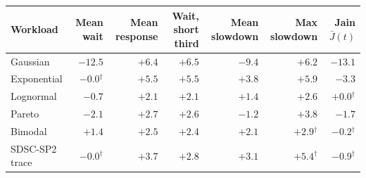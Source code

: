 \begin{tabular}{lrrrrrr}
\toprule
Workload & Mean wait & Mean response & Wait, short third & Mean slowdown & Max slowdown & Jain $\bar J(t)$ \\
\midrule
Gaussian & $-12.5$ & $+6.4$ & $+6.5$ & $-9.4$ & $+6.2$ & $-13.1$ \\
Exponential & $-0.0$$^{\dagger}$ & $+5.5$ & $+5.5$ & $+3.8$ & $+5.9$ & $-3.3$ \\
Lognormal & $-0.7$ & $+2.1$ & $+2.1$ & $+1.4$ & $+2.6$ & $+0.0$$^{\dagger}$ \\
Pareto & $-2.1$ & $+2.7$ & $+2.6$ & $-1.2$ & $+3.8$ & $-1.7$ \\
Bimodal & $+1.4$ & $+2.5$ & $+2.4$ & $+2.1$ & $+2.9$$^{\dagger}$ & $-0.2$$^{\dagger}$ \\
SDSC-SP2 trace & $-0.0$$^{\dagger}$ & $+3.7$ & $+2.8$ & $+3.1$ & $+5.4$$^{\dagger}$ & $-0.9$$^{\dagger}$ \\
\bottomrule
\end{tabular}